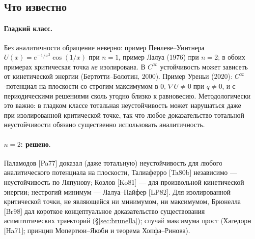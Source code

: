 \documentclass[11pt,a4paper]{article}
\theoremstyle{definition}
\begin{document}
\subsection{Что известно}
\paragraph{Гладкий класс.} Без аналитичности обращение неверно: пример Пенлеве--Уинтнера
$U(x)=e^{-1/x^2}\cos(1/x)$ при $n=1$, пример Лалуа (1976) при $n=2$; в обоих примерах критическая
точка \emph{не} изолирована. В $C^\infty$ устойчивость может зависеть от кинетической энергии
(Бертотти--Болотин, 2000). Пример Уреньи (2020): $C^\infty$-потенциал на плоскости со строгим
максимумом в $0$, $\nabla U\ne0$ при $q\ne0$, и с периодическими решениями сколь угодно близко к
равновесию. Методологически это важно: в гладком классе тотальная неустойчивость может нарушаться
даже при изолированной критической точке, так что любое доказательство тотальной
неустойчивости обязано существенно использовать аналитичность.

\paragraph{$n=2$: решено.} Паламодов [Pa77] доказал (даже тотальную) неустойчивость для любого
аналитического потенциала на плоскости, Талиаферро [Ta80b] независимо --- неустойчивость по Ляпунову;
Козлов [Ko81] --- для произвольной кинетической энергии; нестрогий минимум ---
Лалуа--Пайфер [LP82]. Для изолированной критической точки, не являющейся ни минимумом, ни
максимумом, Брюнелла [Br98] дал короткое концептуальное доказательство существования
асимптотических траекторий (\S\ref{sec:brunella}); случай максимума прост (Хагедорн [Ha71];
принцип Мопертюи--Якоби и теорема Хопфа--Ринова).
\end{document}
